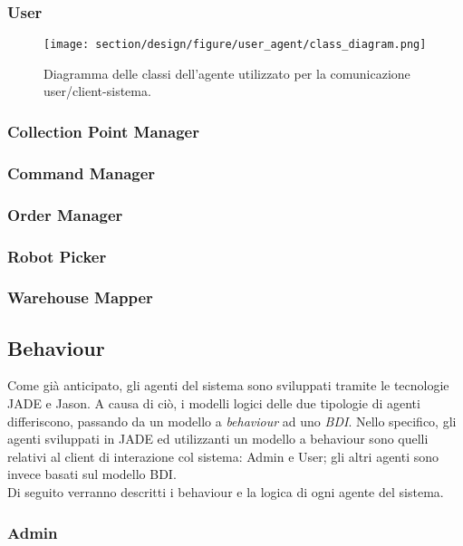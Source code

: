 \subsubsection{User}
\begin{figure}[ht]
    \texttt{[image: section/design/figure/user\_agent/class\_diagram.png]}
    \caption{Diagramma delle classi dell'agente utilizzato per la comunicazione user/client-sistema.}
    \label{fig:class_diagram_user_agent}
\end{figure}

\subsubsection{Collection Point Manager}
\subsubsection{Command Manager}
\subsubsection{Order Manager}
\subsubsection{Robot Picker}
\subsubsection{Warehouse Mapper}

\subsection{Behaviour}


Come già anticipato, gli agenti del sistema sono sviluppati tramite le tecnologie JADE e Jason. A causa di ciò, i modelli logici delle due tipologie di agenti differiscono, passando da un modello a \textit{behaviour} ad uno \textit{BDI}. Nello specifico, gli agenti sviluppati in JADE ed utilizzanti un modello a behaviour sono quelli relativi al client di interazione col sistema: Admin e User; gli altri agenti sono invece basati sul modello BDI.\\
Di seguito verranno descritti i behaviour e la logica di ogni agente del sistema.

\subsubsection{Admin}
